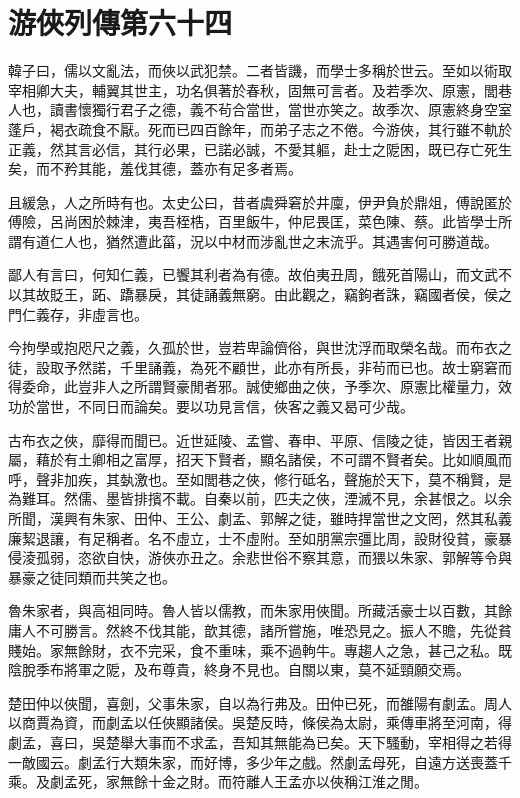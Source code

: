 \chapter{游俠列傳第六十四}

韓子曰，儒以文亂法，而俠以武犯禁。二者皆譏，而學士多稱於世云。至如以術取宰相卿大夫，輔翼其世主，功名俱著於春秋，固無可言者。及若季次、原憲，閭巷人也，讀書懷獨行君子之德，義不茍合當世，當世亦笑之。故季次、原憲終身空室蓬戶，褐衣疏食不厭。死而已四百餘年，而弟子志之不倦。今游俠，其行雖不軌於正義，然其言必信，其行必果，已諾必誠，不愛其軀，赴士之阸困，既已存亡死生矣，而不矜其能，羞伐其德，蓋亦有足多者焉。

且緩急，人之所時有也。太史公曰，昔者虞舜窘於井廩，伊尹負於鼎俎，傅說匿於傅險，呂尚困於棘津，夷吾桎梏，百里飯牛，仲尼畏匡，菜色陳、蔡。此皆學士所謂有道仁人也，猶然遭此菑，況以中材而涉亂世之末流乎。其遇害何可勝道哉。

鄙人有言曰，何知仁義，已饗其利者為有德。故伯夷丑周，餓死首陽山，而文武不以其故貶王，跖、蹻暴戾，其徒誦義無窮。由此觀之，竊鉤者誅，竊國者侯，侯之門仁義存，非虛言也。

今拘學或抱咫尺之義，久孤於世，豈若卑論儕俗，與世沈浮而取榮名哉。而布衣之徒，設取予然諾，千里誦義，為死不顧世，此亦有所長，非茍而已也。故士窮窘而得委命，此豈非人之所謂賢豪閒者邪。誠使鄉曲之俠，予季次、原憲比權量力，效功於當世，不同日而論矣。要以功見言信，俠客之義又曷可少哉。

古布衣之俠，靡得而聞已。近世延陵、孟嘗、春申、平原、信陵之徒，皆因王者親屬，藉於有土卿相之富厚，招天下賢者，顯名諸侯，不可謂不賢者矣。比如順風而呼，聲非加疾，其埶激也。至如閭巷之俠，修行砥名，聲施於天下，莫不稱賢，是為難耳。然儒、墨皆排擯不載。自秦以前，匹夫之俠，湮滅不見，余甚恨之。以余所聞，漢興有朱家、田仲、王公、劇孟、郭解之徒，雖時捍當世之文罔，然其私義廉絜退讓，有足稱者。名不虛立，士不虛附。至如朋黨宗彊比周，設財役貧，豪暴侵淩孤弱，恣欲自快，游俠亦丑之。余悲世俗不察其意，而猥以朱家、郭解等令與暴豪之徒同類而共笑之也。

魯朱家者，與高祖同時。魯人皆以儒教，而朱家用俠聞。所藏活豪士以百數，其餘庸人不可勝言。然終不伐其能，歆其德，諸所嘗施，唯恐見之。振人不贍，先從貧賤始。家無餘財，衣不完采，食不重味，乘不過軥牛。專趨人之急，甚己之私。既陰脫季布將軍之阸，及布尊貴，終身不見也。自關以東，莫不延頸願交焉。

楚田仲以俠聞，喜劍，父事朱家，自以為行弗及。田仲已死，而雒陽有劇孟。周人以商賈為資，而劇孟以任俠顯諸侯。吳楚反時，條侯為太尉，乘傳車將至河南，得劇孟，喜曰，吳楚舉大事而不求孟，吾知其無能為已矣。天下騷動，宰相得之若得一敵國云。劇孟行大類朱家，而好博，多少年之戲。然劇孟母死，自遠方送喪蓋千乘。及劇孟死，家無餘十金之財。而符離人王孟亦以俠稱江淮之閒。

